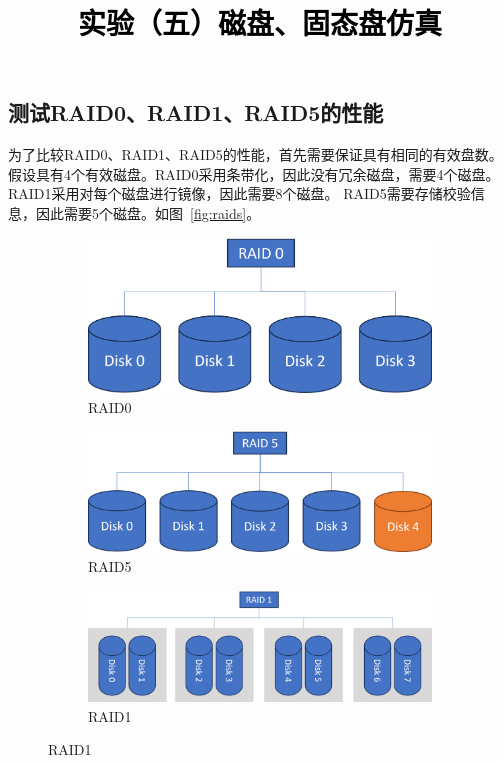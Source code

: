 \documentclass[a4paper,twoside]{article}
\newcommand{\PaperTitle}{实验（五）磁盘、固态盘仿真}  %
\begin{document}
\newpage

\title{
	\Large{\textcolor{black}{\PaperTitle}}
}
	
	
\maketitle
	
\tableofcontents
 
\newpage
\setcounter{page}{1}

\begin{spacing}{1.2}

\section{测试RAID0、RAID1、RAID5的性能}

为了比较RAID0、RAID1、RAID5的性能，首先需要保证具有相同的有效盘数。
假设具有4个有效磁盘。RAID0采用条带化，因此没有冗余磁盘，需要4个磁盘。
RAID1采用对每个磁盘进行镜像，因此需要8个磁盘。
RAID5需要存储校验信息，因此需要5个磁盘。如图~\ref{fig:raids}。
\begin{figure}[h]
	\centering
	\caption{磁盘布局}
	\label{fig:raids}
	\begin{subfigure}{0.35\textwidth}
		\centering
		\caption{RAID0}
		\includegraphics[width=0.9\linewidth]{raid0.png}
	\end{subfigure}
	\begin{subfigure}{0.45\textwidth}
		\centering
		\caption{RAID5}
		\includegraphics[width=0.9\linewidth]{raid5.png}
	\end{subfigure}
	\begin{subfigure}{0.6\textwidth}
		\centering
		\caption{RAID1}
		\includegraphics[width=0.9\linewidth]{raid1.png}
	\end{subfigure}
\end{figure}


\end{spacing}
\end{document}
